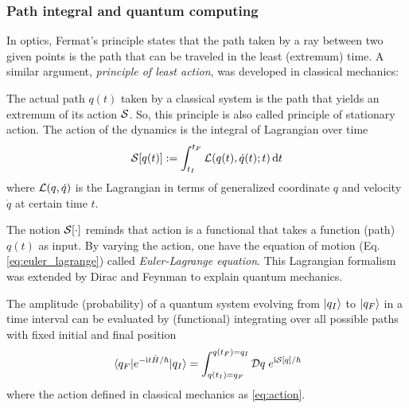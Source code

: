 \subsubsection{Path integral and quantum computing}
\cite{xuLagrangianFormalismQuantum2021}
In optics, Fermat's principle states that the path taken by a ray between two given points is the path that can be traveled in the least (extremum) time. 
A similar argument, \emph{principle of least action}, was developed in classical mechanics:
\begin{axiom}\label{thm:least_action}
    The actual path $q(t)$ taken by a classical system is the path that 
	yields an extremum of its action \(\mathcal{S}\).
	So, this principle is also called principle of stationary action.
	The action of the dynamics is the integral of Lagrangian over time
	\begin{equation}
		\mathcal{S}[q(t)]:=\int_{t_I}^{t_F}\mathcal{L}(q(t),\dot{q}(t);t)\dd{t}
		\label{eq:action}
	\end{equation}
	where $\mathcal{L}(q,\dot{q})$ is the Lagrangian in terms of generalized coordinate $q$ and velocity $\dot{q}$ at certain time $t$. 
\end{axiom}
The notion $\mathcal{S}[\cdot]$ reminds that action is a functional that takes a function (path) $q(t)$ as input.
By varying the action, one have the equation of motion (Eq.\ref{eq:euler_lagrange}) called \emph{Euler-Lagrange equation}.
This Lagrangian formalism was extended by Dirac \cite{diracAnalogyClassicalQuantum1945} and Feynman \cite{feynmanQuantumMechanicsPath2010} to explain quantum mechanics. 
\begin{axiom}\label{thm:path_integral}
    The amplitude (probability) of a quantum system evolving from $\ket{q_I}$ to $\ket{q_F}$ in a time interval can be evaluated by (functional) integrating over all possible paths with fixed initial and final position 
    \begin{equation}
		\mel{q_F}{e^{-\textup{i}t\hat{H}/\hbar}}{q_I} =
        \int_{q(t_I)= q_F}^{q(t_F)=q_I} \mathcal{D} q \; e^{\textup{i} \mathcal{S}[q]/\hbar}
    \end{equation}
	where the action defined in classical mechanics as \cref{eq:action}.
\end{axiom}
